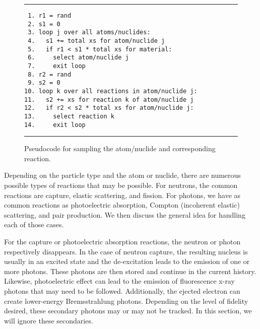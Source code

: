 \begin{figure}[tb!]
\begin{center}
\noindent \rule{\textwidth}{1pt}
\begin{verbatim}
 1. r1 = rand
 2. s1 = 0
 3. loop j over all atoms/nuclides:
 4.   s1 += total xs for atom/nuclide j
 5.   if r1 < s1 * total xs for material:
 6.     select atom/nuclide j
 7.     exit loop
 8. r2 = rand
 9. s2 = 0
10. loop k over all reactions in atom/nuclide j:
11.   s2 += xs for reaction k of atom/nuclide j
12.   if r2 < s2 * total xs for atom/nuclide j:
13.     select reaction k
14.     exit loop
\end{verbatim}
\rule{\textwidth}{1pt}
\caption{Pseudocode for sampling the atom/nuclide and corresponding reaction.}
\label{Fig:probability_monteCarloTransportReactionSamplingAlgorithm}
\end{center}
\end{figure}

Depending on the particle type and the atom or nuclide, there are numerous possible types of reactions that may be possible. For neutrons, the common reactions are capture, elastic scattering, and fission. For photons, we have as common reactions as photoelectric absorption, Compton (incoherent elastic) scattering, and pair production. We then discuss the general idea for handling each of those cases.

For the capture or photoelectric absorption reactions, the neutron or photon respectively disappears. In the case of neutron capture, the resulting nucleus is usually in an excited state and the de-excitation leads to the emission of one or more photons. These photons are then stored and continue in the current history. Likewise, photoelectric effect can lead to the emission of fluorescence x-ray photons that may need to be followed. Additionally, the ejected electron can create lower-energy Bremsstrahlung photons. Depending on the level of fidelity desired, these secondary photons may or may not be tracked. In this section, we will ignore these secondaries.

